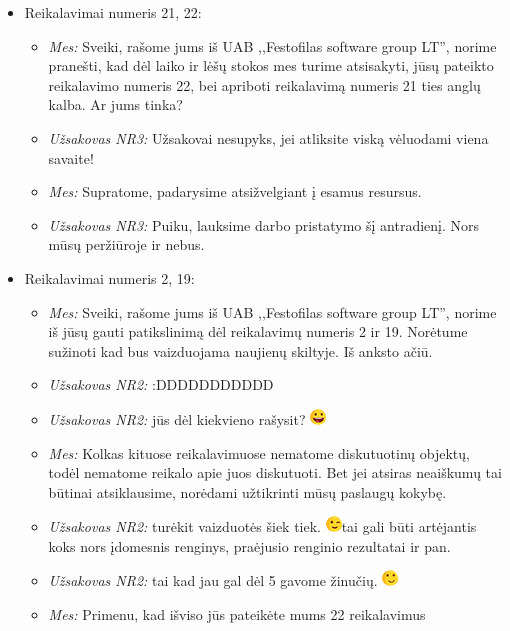 \documentclass{VUMIFPSkursinis}
\begin{document}
\begin{itemize}
			\item Reikalavimai numeris 21, 22:
				\begin{itemize}
					\item \textit{Mes:} Sveiki, rašome jums iš UAB ,,Festofilas software group LT'', norime pranešti, kad dėl laiko ir lėšų stokos mes turime atsisakyti, jūsų pateikto reikalavimo numeris 22, bei apriboti reikalavimą numeris 21 ties anglų kalba. Ar jums tinka?
					\item \textit{Užsakovas NR3:} Užsakovai nesupyks, jei atliksite viską vėluodami viena savaite!
					\item \textit{Mes:} Supratome, padarysime atsižvelgiant į esamus resursus.
					\item \textit{Užsakovas NR3:} Puiku, lauksime darbo pristatymo šį antradienį. Nors mūsų peržiūroje ir nebus.
				\end{itemize}
			\item Reikalavimai numeris 2, 19:
				\begin{itemize}
					\item \textit{Mes:} Sveiki, rašome jums iš UAB ,,Festofilas software group LT'', norime iš jūsų gauti patikslinimą dėl reikalavimų numeris 2 ir 19. Norėtume sužinoti kad bus vaizduojama naujienų skiltyje. Iš anksto ačiū.
					\item \textit{Užsakovas NR2:} :DDDDDDDDDDD
					\item \textit{Užsakovas NR2:} jūs dėl kiekvieno rašysit? \includegraphics{img/smalllaugh.png}
					\item \textit{Mes:} Kolkas kituose reikalavimuose nematome diskutuotinų objektų, todėl nematome reikalo apie juos diskutuoti. Bet jei atsiras neaiškumų tai būtinai atsiklausime, norėdami užtikrinti mūsų paslaugų kokybę.
					\item \textit{Užsakovas NR2:} turėkit vaizduotės šiek tiek. \includegraphics{img/wink.png}tai gali būti artėjantis koks nors įdomesnis renginys, praėjusio renginio rezultatai ir pan.
					\item \textit{Užsakovas NR2:} tai kad jau gal dėl 5 gavome žinučių. \includegraphics{img/smile.png}
					\item \textit{Mes:} Primenu, kad išviso jūs pateikėte mums 22 reikalavimus

\end{itemize}
\end{itemize}
\end{document}
